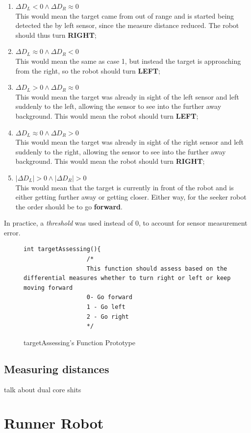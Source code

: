 \documentclass{report}
\begin{document}
\begin{enumerate}
     \item $\Delta D_L<0 \wedge \Delta D_R \approx 0$ \\ This would mean the
     target came from out of range and is started being detected the by left
     sensor, since the measure distance reduced. The robot should thus
     turn \textbf{RIGHT};
     
     \item $\Delta D_L\approx 0\wedge \Delta D_R < 0$ \\ This would mean the same
     as case 1, but instead the target is approaching from the right, so the
     robot should turn \textbf{LEFT};

     \item $\Delta D_L>0\wedge \Delta D_R \approx 0$ \\ This would mean the
     target was already in sight of the left sensor and left suddenly to the
     left, allowing the sensor to see into the further away background. This
     would mean the robot should turn \textbf{LEFT};
     
     \item $\Delta D_L\approx 0 \wedge \Delta D_R > 0$ \\ This would mean the
     target was already in sight of the right sensor and left suddenly to the
     right, allowing the sensor to see into the further away background. This
     would mean the robot should turn \textbf{RIGHT};

     \item $|\Delta D_L|>0\wedge |\Delta D_R| > 0$ \\ This would mean that the
     target is currently in front of the robot and is either getting further
     away or getting closer. Either way, for the seeker robot the order should
     be to go \textbf{forward}.
\end{enumerate}

In practice, a \textit{threshold} was used instead of 0, to account for sensor
measurement error.

\begin{figure}[ht]
      \begin{lstlisting}[style = C_style]
            int targetAssessing(){
                  /*
                  This function should assess based on the differential measures whether to turn right or left or keep moving forward
                  0- Go forward
                  1 - Go left
                  2 - Go right
                  */  
            \end{lstlisting}
            \caption{\label{fig:targetAssessing} targetAssessing's
            Function Prototype}
\end{figure}

\subsection{Measuring distances}
talk about dual core shits

\section{Runner Robot}







\end{document}
